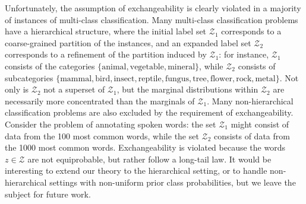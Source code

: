 \documentclass{article}
\begin{document}
Unfortunately, the assumption of exchangeability is clearly violated in a
majority of instances of multi-class classification.  Many multi-class classification problems
have a hierarchical structure, where the initial label set $\mathcal{Z}_1$ corresponds to a coarse-grained partition of the instances, and an expanded label set $\mathcal{Z}_2$ corresponds to a refinement of the partition induced by $\mathcal{Z}_1$:
for instance, $\mathcal{Z}_1$ consists of the categories $\{\text{animal}, \text{vegetable}, \text{mineral}\}$,
while $\mathcal{Z}_2$ consists of subcategories 
$\{\text{mammal}, \text{bird}, \text{insect}, \text{reptile}, \text{fungus}, \text{tree}, \text{flower}, \text{rock}, \text{metal}\}$.
Not only is $\mathcal{Z}_2$ not a superset of $\mathcal{Z}_1$, but the marginal distributions within $\mathcal{Z}_2$ are necessarily more concentrated than the marginals of $\mathcal{Z}_1$.
Many non-hierarchical classification problems are also excluded by the requirement of exchangeability.
Consider the problem of annotating spoken words: the set $\mathcal{Z}_1$ might consist of data from the 100 most common words, while the set $\mathcal{Z}_2$ consists of data from the 1000 most common words.
Exchangeability is violated because the words $z \in \mathcal{Z}$ are not equiprobable, but rather follow a long-tail law.
It would be interesting to extend our theory to the hierarchical setting, or to handle non-hierarchical settings
with non-uniform prior class probabilities, but we leave the subject for future work.
\end{document}
